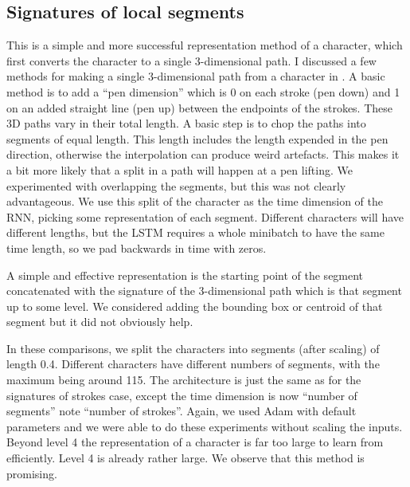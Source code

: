 \subsection{Signatures of local segments}
This is a simple and more successful representation method of a character, which first converts the character to a single 3-dimensional path.
I discussed a few methods for making a single 3-dimensional path from a character in \cite{handwriting}. 
A basic method is to add a ``pen dimension'' which is 0 on each stroke (pen down) and 1 on an added straight line (pen up) between the endpoints of the strokes. 
These 3D paths vary in their total length. 
A  basic step is to chop the paths into segments of equal length. 
This length includes the length expended in the pen direction, otherwise the interpolation can produce weird artefacts. This makes it a bit more likely that a split in a path will happen at a pen lifting.
We experimented with overlapping the segments, but this was not clearly advantageous.
We use this split of the character as the time dimension of the RNN, picking some representation of each segment. 
Different characters will have different lengths, but the LSTM requires a whole minibatch to have the same time length, so we pad backwards in time with zeros.

A simple and effective representation is the starting point of the segment concatenated with the signature of the 3-dimensional path which is that segment up to some level.
We considered adding the bounding box or centroid of that segment but it did not obviously help.

In these comparisons, we split the characters into segments (after scaling) of length 0.4.
Different characters have different numbers of segments, with the maximum being around 115.
The architecture is %
just the same as for the signatures of strokes case, except the time dimension is now ``number of segments'' note ``number of strokes''.
Again, we used Adam with default parameters and we were able to do these experiments without scaling the inputs.
Beyond level 4 the representation of a character is far too large to learn from efficiently. Level 4 is already rather large.
We observe that this method is promising.

